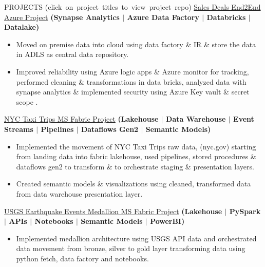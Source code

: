 \documentclass{resume} %
\begin{document}

\vspace{-10pt}

\begin{rSection}{PROJECTS \MakeLowercase{\normalfont\mbox{(Click on project titles to view project repo)}}}
\vspace{-10pt}
{\href{https://github.com/lavanchukka/Sales-Deals-End2End-Azure-Project}{Sales Deals End2End Azure Project}} \textbf{\footnotesize{(Synapse Analytics $|$ Azure Data Factory $|$ Databricks $|$ Datalake)}}
\vspace{-3pt}
\begin{itemize}
\itemsep -2pt {}
\item Moved on premise data into cloud using data factory \& IR \& store the data in ADLS as central data repository. \item Improved reliability using Azure logic apps \& Azure monitor for tracking, performed cleaning \& transformations in data bricks, analyzed data with synapse analytics \& implemented security using Azure Key vault \& secret scope .

\end{itemize}

{\href{https://github.com/lavanchukka/NYC-Taxi-Trips-MS-Fabric-Project}{NYC Taxi Trips MS Fabric Project}} \textbf{\footnotesize {(Lakehouse $|$ Data Warehouse $|$ Event Streams $|$ Pipelines $|$ Dataflows Gen2 $|$ Semantic Models) 
}}
\vspace{-2pt}
\begin{itemize}
\itemsep -2pt {}
\item Implemented the movement of NYC Taxi Trips raw data, (nyc.gov) starting from landing data into fabric lakehouse, used pipelines, stored procedures \& dataflows gen2 to transform \& to orchestrate staging \& presentation layers.
\item Created semantic models \& visualizations using cleaned, transformed data from data warehouse presentation layer.
\end{itemize}

{\href{https://github.com/lavanchukka/USGS-Earthquake-Events-Medallion-Fabric-Project}{USGS Earthquake Events Medallion MS Fabric Project}} \textbf{\footnotesize{(Lakehouse $|$ PySpark $|$ APIs $|$ Notebooks $|$ Semantic Models $|$ PowerBI)}}
\vspace{-3pt}
\begin{itemize}
\itemsep -2pt {}
\item Implemented medallion architecture using USGS API data and orchestrated data movement from bronze, silver to gold layer transforming data using python fetch, data factory and notebooks.
\end{itemize}


\end{rSection}
\end{document}
